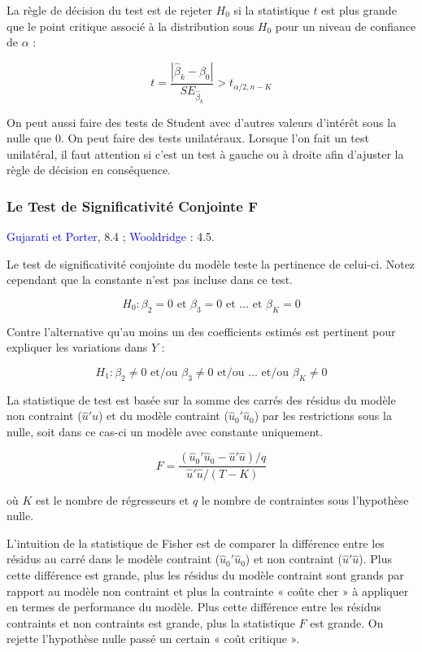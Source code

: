\documentclass[14pt]{extarticle} %
\theoremstyle{definition}
\theoremstyle{plain}
\newcommand{\livre}[1]{\textcolor{blue}{#1}}
\begin{document}
La règle de décision du test est de rejeter $H_0$ si la statistique $t$ est plus grande que le point critique associé à la distribution sous $H_0$ pour un niveau de confiance de $\alpha$ :

\[
t = \frac{|\hat{\beta}_k - \beta_0|}{SE_{\hat{\beta}_k}} > t_{\alpha/2, n-K}
\]

On peut aussi faire des tests de Student avec d’autres valeurs d’intérêt sous la nulle que 0. On peut faire des tests unilatéraux. Lorsque l’on fait un test unilatéral, il faut attention si c’est un test à gauche ou à droite afin d’ajuster la règle de décision en conséquence.

\subsubsection{Le Test de Significativité Conjointe F}

\livre{Gujarati et Porter}, 8.4 ; \livre{Wooldridge} : 4.5.

Le test de significativité conjointe du modèle teste la pertinence de celui-ci. Notez cependant que la constante n’est pas incluse dans ce test.

\[
H_0 : \beta_2 = 0 \text{ et } \beta_3 = 0 \text{ et } \ldots \text{ et } \beta_K = 0
\]

Contre l’alternative qu’au moins un des coefficients estimés est pertinent pour expliquer les variations dans $Y$ :

\[
H_1 : \beta_2 \neq 0 \text{ et/ou } \beta_3 \neq 0 \text{ et/ou } \ldots \text{ et/ou } \beta_K \neq 0
\]

La statistique de test est basée sur la somme des carrés des résidus du modèle non contraint ($\hat{u}'\hat{u}$) et du modèle contraint ($\hat{u}_0'\hat{u}_0$) par les restrictions sous la nulle, soit dans ce cas-ci un modèle avec constante uniquement.

\[
F = \frac{(\hat{u}_0'\hat{u}_0 - \hat{u}'\hat{u}) / q}{\hat{u}'\hat{u} / (T - K)}
\]

où $K$ est le nombre de régresseurs et $q$ le nombre de contraintes sous l’hypothèse nulle.

L’intuition de la statistique de Fisher est de comparer la différence entre les résidus au carré dans le modèle contraint ($\hat{u}_0'\hat{u}_0$) et non contraint ($\hat{u}'\hat{u}$). Plus cette différence est grande, plus les résidus du modèle contraint sont grands par rapport au modèle non contraint et plus la contrainte « coûte cher » à appliquer en termes de performance du modèle. Plus cette différence entre les résidus contraints et non contraints est grande, plus la statistique $F$ est grande. On rejette l’hypothèse nulle passé un certain « coût critique ».
\end{document}
